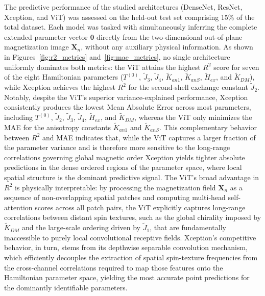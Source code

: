 \documentclass[final,5p,times,twocolumn]{elsarticle}
\begin{document}
The predictive performance of the studied architectures (DenseNet,
ResNet, Xception, and ViT) was assessed on the held-out test set
comprising 15\% of the total dataset. Each model was tasked with
simultaneously inferring the complete extended parameter vector
$\boldsymbol{\theta}$ directly from the two-dimensional out-of-plane
magnetization image $\mathbf{X}_n$, without any auxiliary physical
information. As shown in Figures~\ref{fig:r2_metrics}
and~\ref{fig:mae_metrics}, no single architecture uniformly dominates
both metrics: the ViT attains the highest $R^2$ score for seven of the
eight Hamiltonian parameters ($T^{(0)}$, $\tilde{J}_3$, $\tilde{J}_4$,
$\tilde{K}_{an1}$, $\tilde{K}_{anS}$, $\tilde{H}_{ex}$, and
$\tilde{K}_{DM}$), while Xception achieves the highest $R^2$ for the
second-shell exchange constant $\tilde{J}_2$. Notably, despite the ViT's superior variance-explained
performance, Xception consistently produces the lowest Mean Absolute
Error across most parameters, including $T^{(0)}$, $\tilde{J}_2$,
$\tilde{J}_3$, $\tilde{J}_4$, $\tilde{H}_{ex}$, and $\tilde{K}_{DM}$,
whereas the ViT only minimizes the MAE for the anisotropy constants
$\tilde{K}_{an1}$ and $\tilde{K}_{anS}$. This complementary behavior
between $R^2$ and MAE indicates that, while the ViT captures a larger
fraction of the parameter variance and is therefore more sensitive
to the long-range correlations governing global magnetic order
Xception yields tighter absolute predictions in the dense ordered
regions of the parameter space, where local spatial structure is the
dominant predictive signal. The ViT's broad advantage in $R^2$ is
physically interpretable: by processing the magnetization field
$\mathbf{X}_n$ as a sequence of non-overlapping spatial patches and
computing multi-head self-attention scores across all patch pairs, the
ViT explicitly captures long-range correlations between distant spin
textures, such as the global chirality imposed by $\tilde{K}_{DM}$
and the large-scale ordering driven by $\tilde{J}_1$, that are
fundamentally inaccessible to purely local convolutional receptive
fields. Xception's competitive behavior, in turn, stems from its
depthwise separable convolution mechanism, which efficiently decouples
the extraction of spatial spin-texture frequencies from the
cross-channel correlations required to map those features onto the
Hamiltonian parameter space, yielding the most accurate point
predictions for the dominantly identifiable parameters.
\end{document}
